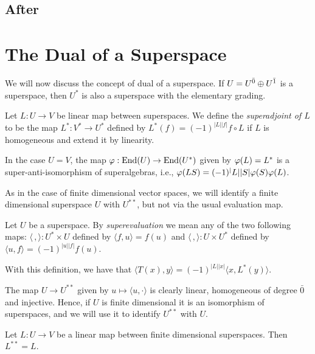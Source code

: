\documentclass{amsbook}
\begin{document}
\section{After}




\chapter{The Dual of a Superspace}

We will now discuss the concept of dual of a superspace. If $U = U^{\bar0} \oplus U^{\bar1}$ is a superspace, then $U^*$ is also a superspace with the elementary grading.

\begin{defi}
    Let $L: U \to V$ be linear map between superspaces.
    We define the \emph{superadjoint of $L$} to be the map $L^*: V^* \to U^*$ defined by $L^*(f) = (-1)^{|L||f|} f \circ L$ if $L$ is homogeneous and extend it by linearity.
\end{defi}

In the case $U = V$, the map $\varphi: \operatorname{End}(U) \to \operatorname{End}(U^*)$ given by $\varphi(L) = L^*$ is a super-anti-isomorphism of superalgebras, i.e., $\varphi (LS) = (-1)^|L||S| \varphi(S) \varphi(L)$.

As in the case of finite dimensional vector spaces, we will identify a finite dimensional superspace $U$ with $U^{**}$, but not via the usual evaluation map.

\begin{defi}
    Let $U$ be a superspace. By \emph{superevaluation} we mean any of the two following maps: $ \langle\, ,\rangle : U^* \times U$ defined by $\langle f, u\rangle = f(u)$ and  $ \langle\, ,\rangle : U \times U^*$ defined by $\langle u, f\rangle = (-1)^{|u||f|}f(u)$. 
\end{defi}

With this definition, we have that $\langle T(x), y\rangle = (-1)^{|L||x|}\langle x, L^* (y)\rangle$.

The map $U \to U^{**}$ given by $u \mapsto  \langle u , \cdot \rangle$ is clearly linear, homogeneous of degree $\bar 0$ and injective. Hence, if $U$ is finite dimensional it is an isomorphism of superspaces, and we will use it to identify $U^{**}$ with $U$.

\begin{prop}\label{prop:superadjunction-is-involutive}
    Let $L: U \to V$ be a linear map between finite dimensional superspaces. Then $L^{**} = L$.
\end{prop}
\end{document}
